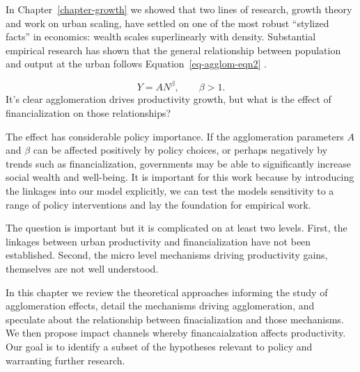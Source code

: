 In Chapter~\ref{chapter-growth} we showed that  two lines of research, growth theory and work on urban scaling, have settled on one of the most robust ``stylized facts'' in economics: wealth scales superlinearly with density. Substantial empirical research has shown that the general relationship between population and output at the urban %
follows Equation~\ref{eq-agglom-eqn2} \cite{loboUrbanScalingProduction2013}.%

\begin{equation}\label{eq-agglom-eqn2}
    Y=AN^\beta,\qquad \beta>1. 
\end{equation}
It's clear agglomeration drives productivity growth, but what is the effect of financialization on those relationships? 

The effect has %
considerable policy importance. If the agglomeration parameters $A$ and  $\beta$ can be affected positively by policy choices, or perhaps negatively by trends such as financialization,  governments may be able to significantly increase social wealth and well-being.  It is important for this work because by introducing the linkages into our model explicitly, we can test the models sensitivity to a range of policy interventions and lay the foundation for empirical work.

The question is important but it is complicated on at least two levels. First, the linkages between urban productivity and financialization have not been established. Second, the micro level mechanisms driving productivity gains, themselves are not well understood.

In this chapter we review the theoretical approaches informing the study of agglomeration effects, detail the mechanisms driving agglomeration, and speculate about the relationship between finacialization and those mechanisms. We then propose impact channels whereby financaialzation affects productivity. Our goal is to identify a subset of the hypotheses relevant to policy and %
warranting further research.

